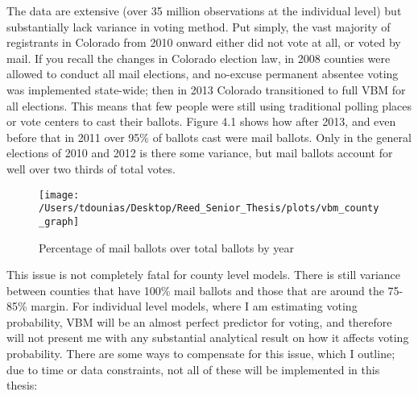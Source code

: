 \documentclass[12pt,twoside]{reedthesis}
\begin{document}
  The data are extensive (over 35 million observations at the individual
  level) but substantially lack variance in voting method. Put simply, the
  vast majority of registrants in Colorado from 2010 onward either did not
  vote at all, or voted by mail. If you recall the changes in Colorado
  election law, in 2008 counties were allowed to conduct all mail
  elections, and no-excuse permanent absentee voting was implemented
  state-wide; then in 2013 Colorado transitioned to full VBM for all
  elections. This means that few people were still using traditional
  polling places or vote centers to cast their ballots. Figure 4.1 shows
  how after 2013, and even before that in 2011 over 95\% of ballots cast
  were mail ballots. Only in the general elections of 2010 and 2012 is
  there some variance, but mail ballots account for well over two thirds
  of total votes.
  
  \begin{figure}
  
  {\centering \texttt{[image: /Users/tdounias/Desktop/Reed\_Senior\_Thesis/plots/vbm\_county\_graph]} 
  
  }
  
  \caption[Percentage of mail ballots over total ballots by year]{Percentage of mail ballots over total ballots by year}\label{fig:vbm png}
  \end{figure}
  
  This issue is not completely fatal for county level models. There is
  still variance between counties that have 100\% mail ballots and those
  that are around the 75-85\% margin. For individual level models, where I
  am estimating voting probability, VBM will be an almost perfect
  predictor for voting, and therefore will not present me with any
  substantial analytical result on how it affects voting probability.
  There are some ways to compensate for this issue, which I outline; due
  to time or data constraints, not all of these will be implemented in
  this thesis:
  
\end{document}
